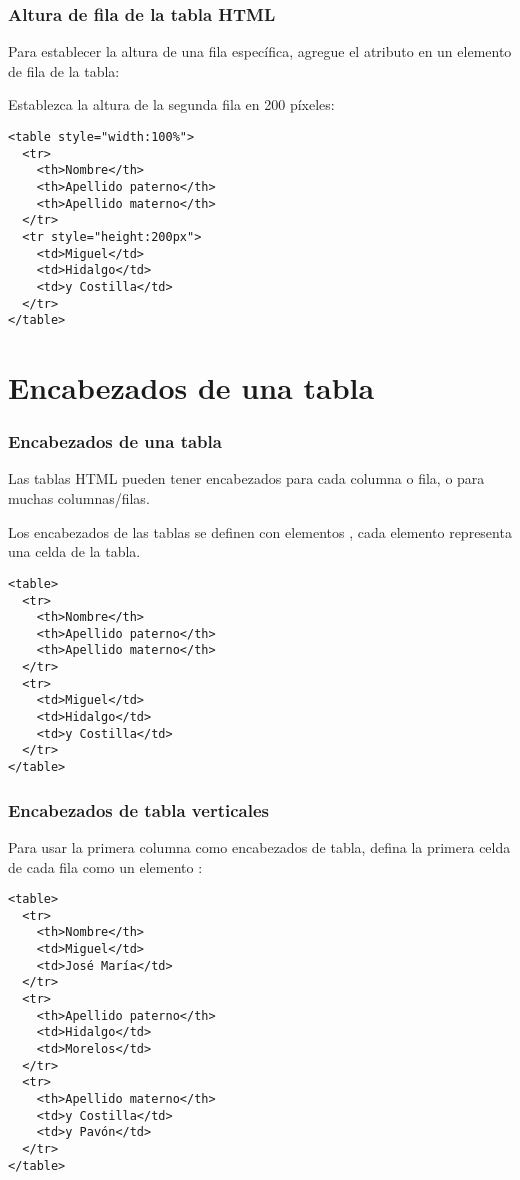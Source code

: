 \begin{frame}[fragile]
  \frametitle{Altura de fila de la tabla HTML}

  Para establecer la altura de una fila específica, agregue el
  atributo  en un elemento de fila de la tabla:

  \vspace{\baselineskip}
  Establezca la altura de la segunda fila en 200 píxeles:
  \begin{lstlisting}
<table style="width:100%">
  <tr>
    <th>Nombre</th>
    <th>Apellido paterno</th>
    <th>Apellido materno</th>
  </tr>
  <tr style="height:200px">
    <td>Miguel</td>
    <td>Hidalgo</td>
    <td>y Costilla</td>
  </tr>
</table> 
  \end{lstlisting}
\end{frame}

\section{Encabezados de una tabla}

\begin{frame}[fragile]
  \frametitle{Encabezados de una tabla}

  Las tablas HTML pueden tener encabezados para cada columna o
  fila, o para muchas columnas/filas.

  Los encabezados de las tablas se definen con elementos ,
  cada elemento  representa una celda de la tabla.
  \vspace{\baselineskip}
  \begin{lstlisting}
<table>
  <tr>
    <th>Nombre</th>
    <th>Apellido paterno</th>
    <th>Apellido materno</th>
  </tr>
  <tr>
    <td>Miguel</td>
    <td>Hidalgo</td>
    <td>y Costilla</td>
  </tr>
</table> 
  \end{lstlisting}
\end{frame}

\begin{frame}[fragile]
  \frametitle{Encabezados de tabla verticales}

  Para usar la primera columna como encabezados de tabla,
  defina la primera celda de cada fila como un elemento :

  \begin{lstlisting}
<table>
  <tr>
    <th>Nombre</th>
    <td>Miguel</td>
    <td>José María</td>
  </tr>
  <tr>
    <th>Apellido paterno</th>
    <td>Hidalgo</td>
    <td>Morelos</td>
  </tr>
  <tr>
    <th>Apellido materno</th>
    <td>y Costilla</td>
    <td>y Pavón</td>
  </tr>
</table> 
  \end{lstlisting}
\end{frame}

